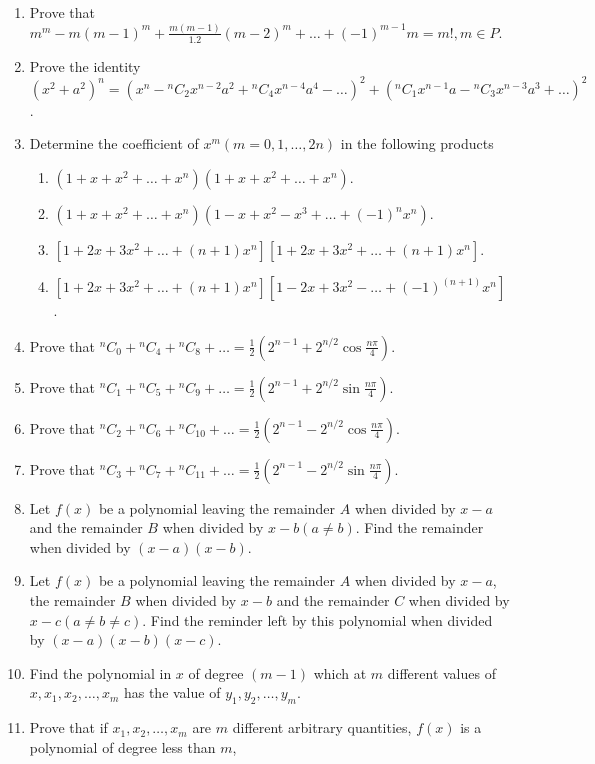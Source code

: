 \begin{enumerate}[resume]
\item Prove that $m^m - m(m - 1)^m + \frac{m(m - 1)}{1.2}(m - 2)^m + \ldots + (-1)^{m - 1}m = m!, m \in P$.
\item Prove the identity $(x^2 + a^2)^n = (x^n - {}^nC_2x^{n - 2}a^2 + {}^nC_4x^{n - 4}a^4 - \ldots)^2 + ({}^nC_1x^{n - 1}a - {}^nC_3x^{n -
  3}a^3 +\ldots)^2$.
\item Determine the coefficient of $x^m(m = 0, 1, \ldots, 2n)$ in the following products
  \begin{enumerate}
  \item $(1 + x + x^2 + \ldots + x^n)(1 + x + x^2 + \ldots + x^n)$.
  \item $(1 + x + x^2 + \ldots + x^n)(1 - x + x^2 - x^3 + \ldots + (-1)^nx^n)$.
  \item $[1 + 2x + 3x^2 + \ldots + (n + 1)x^n][1 + 2x + 3x^2 + \ldots + (n + 1)x^n]$.
  \item $[1 + 2x + 3x^2 + \ldots + (n + 1)x^n][1 - 2x + 3x^2 -\ldots  + (-1)^(n + 1)x^n]$.
  \end{enumerate}
\item Prove that ${}^nC_0 + {}^nC_4 + {}^nC_8 + \ldots = \frac{1}{2}\left(2^{n - 1} + 2^{n/2}\cos\frac{n\pi}{4}\right)$.
\item Prove that ${}^nC_1 + {}^nC_5 + {}^nC_9 + \ldots = \frac{1}{2}\left(2^{n - 1} + 2^{n/2}\sin\frac{n\pi}{4}\right)$.
\item Prove that ${}^nC_2 + {}^nC_6 + {}^nC_{10} + \ldots = \frac{1}{2}\left(2^{n - 1} - 2^{n/2}\cos\frac{n\pi}{4}\right)$.
\item Prove that ${}^nC_3 + {}^nC_7 + {}^nC_{11} + \ldots = \frac{1}{2}\left(2^{n - 1} - 2^{n/2}\sin\frac{n\pi}{4}\right)$.
\item Let $f(x)$ be a polynomial leaving the remainder $A$ when divided by $x - a$ and the remainder $B$ when divided by $x -
  b(a\neq b)$. Find the remainder when divided by $(x - a)(x - b)$.
\item Let $f(x)$ be a polynomial leaving the remainder $A$ when divided by $x - a$, the remainder $B$ when divided by $x -
  b$ and the remainder $C$ when divided by $x - c(a\neq b\neq c)$. Find the reminder left by this polynomial when divided by $(x -
  a)(x - b)(x - c)$.
\item Find the polynomial in $x$ of degree $(m - 1)$ which at $m$ different values of $x, x_1, x_2, \ldots, x_m$ has the value of
  $y_1, y_2, \ldots, y_m$.
\item Prove that if $x_1, x_2, \ldots, x_m$ are $m$ different arbitrary quantities, $f(x)$ is a polynomial of degree less than $m$,

\end{enumerate}
